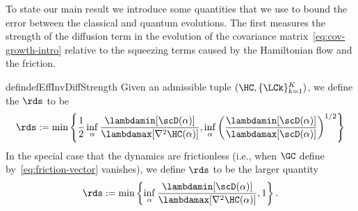 \documentclass{article}
\numberwithin{equation}{section}
\begin{document}
	






To state our main result we introduce some quantities that we use to bound the  error between the classical and quantum evolutions.  The first measures the strength of the diffusion term in the evolution of the covariance matrix~\eqref{eq:cov-growth-intro} relative to the squeezing terms caused by the Hamiltonian flow and the friction.

\begin{restatable}{defin}{defEffInvDiffStrength}\label{def:eff-inv-diff-strength}
Given an admissible tuple $(\HC,\{\LCk\}_{k=1}^K)$, we define the  $\rds$ to be 
\begin{align}
\label{eq:zz-def}
\rds := \min\left\{  
         \frac12 \inf_\alpha 
        \frac{\lambdamin[\scD(\alpha)]}{\lambdamax[\nabla^2\HC(\alpha)]},
        \inf_\alpha 
        \left(\frac{\lambdamin[\scD(\alpha)]}{\lambdamax[\scD(\alpha)]}\right)^{1/2}
        \right\}
\end{align}
In the special case that the dynamics are frictionless (i.e., when $\GC$ define by~\eqref{eq:friction-vector} vanishes), we define $\rds$ to be the larger quantity
\begin{align}
\label{eq:zz-def-frictionless}
\rds := \min\left\{ 
        \inf_\alpha 
        \frac{\lambdamin[\scD(\alpha)]}{\lambdamax[\nabla^2\HC(\alpha)]},1
        \right\}.
\end{align}
\end{restatable}
\end{document}
